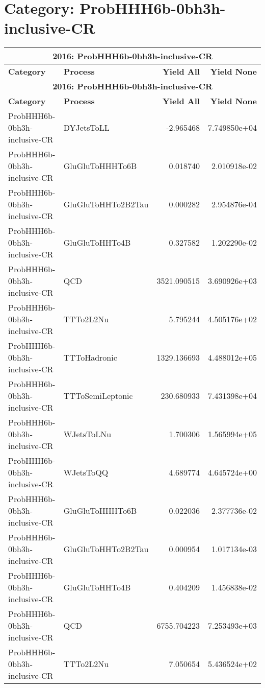 \section*{Category: ProbHHH6b-0bh3h-inclusive-CR}
\begin{longtable}[c]{|l|l|r|r|}
\hline
\multicolumn{4}{|c|}{\textbf{2016: ProbHHH6b-0bh3h-inclusive-CR}} \\
\hline
\textbf{Category} & \textbf{Process} & \textbf{Yield All} & \textbf{Yield None} \\
\hline
\endfirsthead
\hline
\multicolumn{4}{|c|}{\textbf{2016: ProbHHH6b-0bh3h-inclusive-CR}} \\
\hline
\textbf{Category} & \textbf{Process} & \textbf{Yield All} & \textbf{Yield None} \\
\hline
\endhead
ProbHHH6b-0bh3h-inclusive-CR & DYJetsToLL & -2.965468 & 7.749850e+04 \\
\hline
ProbHHH6b-0bh3h-inclusive-CR & GluGluToHHHTo6B & 0.018740 & 2.010918e-02 \\
\hline
ProbHHH6b-0bh3h-inclusive-CR & GluGluToHHTo2B2Tau & 0.000282 & 2.954876e-04 \\
\hline
ProbHHH6b-0bh3h-inclusive-CR & GluGluToHHTo4B & 0.327582 & 1.202290e-02 \\
\hline
ProbHHH6b-0bh3h-inclusive-CR & QCD & 3521.090515 & 3.690926e+03 \\
\hline
ProbHHH6b-0bh3h-inclusive-CR & TTTo2L2Nu & 5.795244 & 4.505176e+02 \\
\hline
ProbHHH6b-0bh3h-inclusive-CR & TTToHadronic & 1329.136693 & 4.488012e+05 \\
\hline
ProbHHH6b-0bh3h-inclusive-CR & TTToSemiLeptonic & 230.680933 & 7.431398e+04 \\
\hline
ProbHHH6b-0bh3h-inclusive-CR & WJetsToLNu & 1.700306 & 1.565994e+05 \\
\hline
ProbHHH6b-0bh3h-inclusive-CR & WJetsToQQ & 4.689774 & 4.645724e+00 \\
\hline
ProbHHH6b-0bh3h-inclusive-CR & GluGluToHHHTo6B & 0.022036 & 2.377736e-02 \\
\hline
ProbHHH6b-0bh3h-inclusive-CR & GluGluToHHTo2B2Tau & 0.000954 & 1.017134e-03 \\
\hline
ProbHHH6b-0bh3h-inclusive-CR & GluGluToHHTo4B & 0.404209 & 1.456838e-02 \\
\hline
ProbHHH6b-0bh3h-inclusive-CR & QCD & 6755.704223 & 7.253493e+03 \\
\hline
ProbHHH6b-0bh3h-inclusive-CR & TTTo2L2Nu & 7.050654 & 5.436524e+02 \\

\end{longtable}
